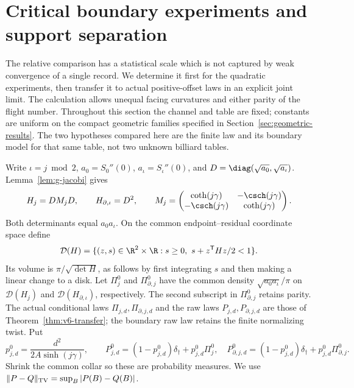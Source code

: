 \section{Critical boundary experiments and support separation}
\label{sec:v7-critical}
The relative comparison has a statistical scale which is not captured by
weak convergence of a single record. We determine it first for the
quadratic experiments, then transfer it to actual positive-offset laws
in an explicit joint limit. The calculation allows unequal facing
curvatures and either parity of the flight number. Throughout this
section the channel and table are fixed; constants are uniform on the
compact geometric families specified in Section~\ref{sec:geometric-results}.
The two hypotheses compared here are the finite law and its boundary
model for that same table, not two unknown billiard tables.

Write $\iota=j\bmod2$, $a_0=S_0''(0)$, $a_\iota=S_\iota''(0)$, and
$D=\diag(\sqrt{a_0},\sqrt{a_\iota})$. Lemma~\ref{lem:g-jacobi} gives
\begin{equation}\label{eq:v7-whitening}
 H_j=D M_jD,\qquad H_{\partial,\iota}=D^2,\qquad
 M_j=\begin{pmatrix}\coth(j\gamma)&-\csch(j\gamma)\\
                    -\csch(j\gamma)&\coth(j\gamma)\end{pmatrix}.
\end{equation}
Both determinants equal $a_0a_\iota$. On the common endpoint--residual
coordinate space define
\[
 \mathcal D(H)=\{(z,s)\in\R^2\times\R:s\ge0,
                         \ s+z^{\mathsf T}Hz/2<1\}.
\]
Its volume is $\pi/\sqrt{\det H}$, as follows by first integrating
$s$ and then making a linear change to a disk. Let $\Pi_j^0$ and
$\Pi_{\partial,j}^0$ have the common density $\sqrt{a_0a_\iota}/\pi$
on $\mathcal D(H_j)$ and $\mathcal D(H_{\partial,\iota})$, respectively.
The second subscript in $\Pi_{\partial,j}^0$ retains parity.
The actual conditional laws $\Pi_{j,d},\Pi_{\partial,j,d}$ and the
raw laws $P_{j,d},P_{\partial,j,d}$ are those of
Theorem~\ref{thm:v6-transfer}; the boundary raw law retains the finite
normalizing twist. Put
\begin{equation}\label{eq:v7-tangent-mass}
 p_{j,d}^0=\frac{d^2}{2A\sinh(j\gamma)},\qquad
 P_{j,d}^0=(1-p_{j,d}^0)\delta_{\dagger}+p_{j,d}^0\Pi_j^0,
 \quad
 P_{\partial,j,d}^0=(1-p_{j,d}^0)\delta_{\dagger}
                         +p_{j,d}^0\Pi_{\partial,j}^0.
\end{equation}
Shrink the common collar so these are probability measures. We use
$\|P-Q\|_{\rm TV}=\sup_B|P(B)-Q(B)|$.

